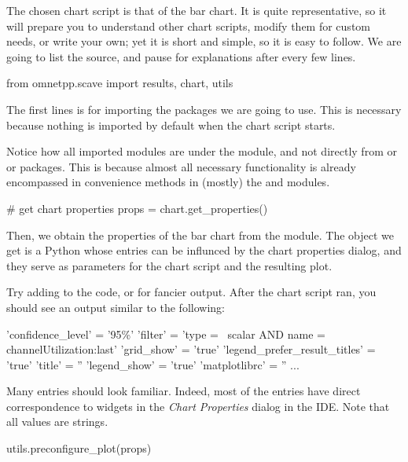 The chosen chart script is that of the bar chart. It is quite representative, so
it will prepare you to understand other chart scripts, modify them for custom
needs, or write your own; yet it is short and simple, so it is easy to follow.
We are going to list the source, and pause for explanations after every few lines.

\begin{python}
from omnetpp.scave import results, chart, utils
\end{python}

The first lines is for importing the packages we are going to use. This is
necessary because nothing is imported by default when the chart script starts.

Notice how all imported modules are under the  module, and not
directly from  or  or  packages. This is
because almost all necessary functionality is already encompassed in convenience
methods in (mostly) the  and  modules.

\begin{python}
# get chart properties
props = chart.get_properties()
\end{python}

Then, we obtain the properties of the bar chart from the  module.
The  object we get is a Python  whose entries can be
influnced by the chart properties dialog, and they serve as parameters for
the chart script and the resulting plot.

Try adding  to the code, or  for fancier output. After the chart script ran,
you should see an output similar to the following:

\begin{commandline}
'confidence_level' = '95\%'
'filter' = 'type =~ scalar AND name =~ channelUtilization:last'
'grid_show' = 'true'
'legend_prefer_result_titles' = 'true'
'title' = ''
'legend_show' = 'true'
'matplotlibrc' = ''
...
\end{commandline}

Many entries should look familiar. Indeed, most of the entries have direct
correspondence to widgets in the \textit{Chart Properties} dialog in the IDE.
Note that all values are strings.

\begin{python}
utils.preconfigure_plot(props)
\end{python}


